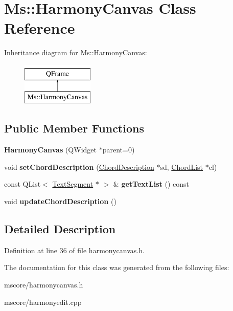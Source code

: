 \hypertarget{class_ms_1_1_harmony_canvas}{}\section{Ms\+:\+:Harmony\+Canvas Class Reference}
\label{class_ms_1_1_harmony_canvas}
Inheritance diagram for Ms\+:\+:Harmony\+Canvas\+:\begin{figure}[H]
\begin{center}
\leavevmode
\includegraphics[height=2.000000cm]{class_ms_1_1_harmony_canvas}
\end{center}
\end{figure}
\subsection*{Public Member Functions}
\begin{DoxyCompactItemize}
\item 
\mbox{\label{class_ms_1_1_harmony_canvas_abd62f09ea815587e164bf6202c28eca4}} 
{\bfseries Harmony\+Canvas} (Q\+Widget $\ast$parent=0)
\item 
\mbox{\label{class_ms_1_1_harmony_canvas_ae5eb66a68a9895620dfc39238ce945b2}} 
void {\bfseries set\+Chord\+Description} (\hyperlink{struct_ms_1_1_chord_description}{Chord\+Description} $\ast$sd, \hyperlink{class_ms_1_1_chord_list}{Chord\+List} $\ast$cl)
\item 
\mbox{\label{class_ms_1_1_harmony_canvas_ab1078d36c3a8fa3226f167f4d0f1cf8c}} 
const Q\+List$<$ \hyperlink{struct_ms_1_1_text_segment}{Text\+Segment} $\ast$ $>$ \& {\bfseries get\+Text\+List} () const
\item 
\mbox{\label{class_ms_1_1_harmony_canvas_a3cb86a391b4b0a4c3691406371a68e15}} 
void {\bfseries update\+Chord\+Description} ()
\end{DoxyCompactItemize}


\subsection{Detailed Description}


Definition at line 36 of file harmonycanvas.\+h.



The documentation for this class was generated from the following files\+:\begin{DoxyCompactItemize}
\item 
mscore/harmonycanvas.\+h\item 
mscore/harmonyedit.\+cpp\end{DoxyCompactItemize}
